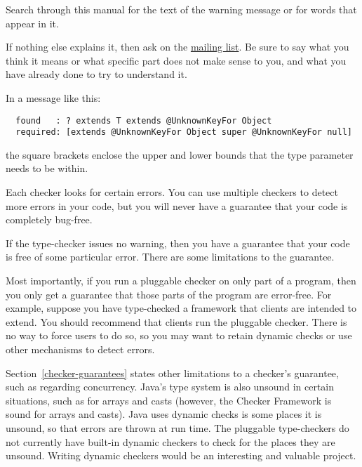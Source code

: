 Search through this manual for the text of the warning message or for words
that appear in it.

If nothing else explains it, then ask on the
\href{https://groups.google.com/forum/#!forum/checker-framework-discuss}{mailing
  list}.  Be sure to say what you think it means or what specific part does
not make sense to you, and what you have already done to try to understand it.



In a message like this:

\begin{Verbatim}
  found   : ? extends T extends @UnknownKeyFor Object
  required: [extends @UnknownKeyFor Object super @UnknownKeyFor null]
\end{Verbatim}

\noindent
the square brackets enclose the upper and lower bounds that the type parameter needs to be within.



Each checker looks for certain errors.  You can use multiple checkers to
detect more errors in your code, but you will never have a guarantee that
your code is completely bug-free.

If the type-checker issues no warning, then you have a guarantee that your
code is free of some particular error.  There are some limitations to the
guarantee.

Most importantly, if you run a pluggable checker on only part of a program, then
you only get a guarantee that those parts of the program are error-free.
For example, suppose you have type-checked a framework that clients
are intended to extend.  You should recommend that clients
run the pluggable checker.  There is no way to force users to do so, so you
may want to retain dynamic checks or use other mechanisms to detect errors.

Section~\ref{checker-guarantees} states other limitations to a checker's
guarantee, such as regarding concurrency.  Java's type system is also
unsound in certain situations, such as for arrays and casts (however, the
Checker Framework is sound for arrays and casts).  Java uses dynamic checks
is some places it is unsound, so that errors are thrown at run time.  The
pluggable type-checkers do not currently have built-in dynamic checkers to
check for the places they are unsound.
Writing dynamic checkers would be an interesting and valuable project.

